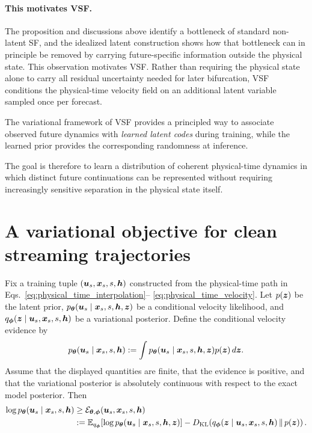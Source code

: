 \paragraph{This motivates VSF.}
The proposition and discussions above identify a bottleneck of
standard non-latent SF, and the idealized latent construction shows
how that bottleneck can in principle be removed by carrying future-specific
information outside the physical state.
This observation motivates VSF. Rather than requiring the physical state alone
to carry all residual uncertainty needed for later bifurcation, VSF conditions
the physical-time velocity field on an additional latent variable sampled once
per forecast. 
\begin{tcolorbox}[
  colback=parchment,
  colframe=sandborder,
  boxrule=0.1pt,
  left=8pt,
  right=8pt,
  top=0.3pt,
  bottom=0.3pt
]
\centering
The variational  framework of VSF provides a principled way to associate
observed future dynamics with {\it learned latent codes} during training, while the learned prior
provides the corresponding randomness at inference. 
\end{tcolorbox}
The goal is therefore to
learn a distribution of coherent physical-time dynamics in which distinct
future continuations can be represented without requiring increasingly
sensitive separation in the physical state itself.




\clearpage
\section{A variational objective for clean streaming trajectories}
\label{sec:clean_velocity_elbo}


\begin{vsfproposition}
\label{prop:velocity_elbo}
Fix a training tuple $({\bm{u}}_s,{\bm{x}}_s,s,{\bm{h}})$ constructed from the physical-time
path in Eqs.~\ref{eq:physical_time_interpolation}--
\ref{eq:physical_time_velocity}.  Let $p({\bm{z}})$ be the latent prior, 
$p_{{\bm{\theta}}}({\bm{u}}_s\mid{\bm{x}}_s,s,{\bm{h}},{\bm{z}})$ be a conditional velocity
likelihood, and $q_{\boldsymbol{\phi}}({\bm{z}}\mid{\bm{u}}_s,{\bm{x}}_s,s,{\bm{h}})$ be a
variational posterior.  Define the conditional velocity evidence by
\begin{equation}
  p_{{\bm{\theta}}}({\bm{u}}_s\mid{\bm{x}}_s,s,{\bm{h}})
  :=
  \int
  p_{{\bm{\theta}}}({\bm{u}}_s\mid{\bm{x}}_s,s,{\bm{h}},{\bm{z}})
  p({\bm{z}})\,d{\bm{z}}.
  \label{eq:conditional_velocity_evidence}
\end{equation}
Assume that the displayed quantities are finite, that the evidence is
positive, and that the variational posterior is absolutely continuous with
respect to the exact model posterior.
Then
\begin{align}
  \log p_{{\bm{\theta}}}({\bm{u}}_s\mid{\bm{x}}_s,s,{\bm{h}})
  &\geq
  \mathcal E_{{\bm{\theta}},\boldsymbol{\phi}}({\bm{u}}_s,{\bm{x}}_s,s,{\bm{h}})
  \notag\\
  &:={}
  \mathbb{E}_{q_{\boldsymbol{\phi}}}
  \!\left[
    \log p_{{\bm{\theta}}}({\bm{u}}_s\mid{\bm{x}}_s,s,{\bm{h}},{\bm{z}})
  \right]
  \notag
  -
  D_{\mathrm{KL}}\!\left(
    q_{\boldsymbol{\phi}}({\bm{z}}\mid{\bm{u}}_s,{\bm{x}}_s,s,{\bm{h}})
    \,\Vert\,
    p({\bm{z}})
  \right).
  \label{eq:pointwise_velocity_elbo}
\end{align}
\end{vsfproposition}

